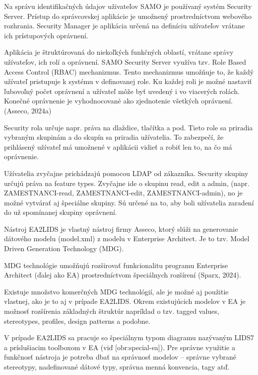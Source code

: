 Na správu identifikačných údajov uživateľov SAMO je používaný systém Security Server. Prístup do správcovskej aplikácie je umožnený prostredníctvom webového rozhrania. Security Manager je aplikácia určená na definíciu užívateľov vrátane ich prístupových oprávnení. 

Aplikácia je štruktúrovaná do niekoľkých funkčných oblastí, vrátane správy užívateľov, ich rolí a oprávnení. SAMO Security Server využíva tzv. Role Based Access Control (RBAC) mechanizmus. Tento mechanizmus umožňuje to, že každý užívateľ pristupuje k systému v definovanej role. Ku každej roli je možné nastaviť ľubovoľný počet oprávnení a užívateľ môže byť uvedený i vo viacerých rolách. Konečné oprávnenie je vyhodnocované ako zjednotenie všetkých oprávnení. \scr(Asseco, 2024a)

Security rola určuje napr. práva na dlaždice, tlačítka a pod. Tieto role sa priradia vybraným skupinám a do skupín sa priradia užívatelia. To zabezpečí, že prihlásený užívateľ má umožnené v aplikácii vidieť a robiť len to, na čo má oprávnenie.

Užívatelia zvyčajne prichádzajú pomocou LDAP od zákazníka. Security skupiny určujú práva na feature types. Zvyčajne ide o skupinu read, edit a admin, (napr. ZAMESTNANCI-read, ZAMESTNANCI-edit, ZAMESTNANCI-admin), no je možné vytvárať aj špeciálne skupiny. Sú určené na to, aby boli užívatelia zaradení do už spomínanej skupiny oprávnení.


Nástroj EA2LIDS je vlastný nástroj firmy Asseco, ktorý slúži na generovanie dátového modelu (model.xml) z modelu v Enterprise Architect. Je to tzv. Model Driven Generation Technology (MDG). 

MDG technológie umožňujú rozširovať funkcionalitu programu Enterprise Architect (ďalej ako EA) prostredníctvom špeciálnych rozšírení \scr(Sparx, 2024). 

Existuje množstvo komerčných MDG technológií, ale je možné aj použitie vlastnej, ako je to aj v prípade EA2LIDS. Okrem existujúcich modelov v EA je možnosť rozšírenia základných štruktúr napríklad o tzv. tagged values, stereotypes, profiles, design patterns a podobne. 

V prípade EA2LIDS sa pracuje so špeciálnym typom diagramu nazývaným LIDS7 a príslušiacim toolboxom v EA (viď [obr:special-ea]). Pre správne využitie a funkčnosť nástroja je potreba dbať na správnosť modelov -- správne vybrané stereotypy, nadefinované dátové typy, správna menná konvencia, tagy atď. 

